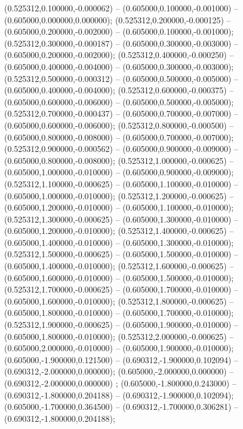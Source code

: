  (0.525312,0.100000,-0.000062) -- (0.605000,0.100000,-0.001000) -- (0.605000,0.000000,0.000000);
 (0.525312,0.200000,-0.000125) -- (0.605000,0.200000,-0.002000) -- (0.605000,0.100000,-0.001000);
 (0.525312,0.300000,-0.000187) -- (0.605000,0.300000,-0.003000) -- (0.605000,0.200000,-0.002000);
 (0.525312,0.400000,-0.000250) -- (0.605000,0.400000,-0.004000) -- (0.605000,0.300000,-0.003000);
 (0.525312,0.500000,-0.000312) -- (0.605000,0.500000,-0.005000) -- (0.605000,0.400000,-0.004000);
 (0.525312,0.600000,-0.000375) -- (0.605000,0.600000,-0.006000) -- (0.605000,0.500000,-0.005000);
 (0.525312,0.700000,-0.000437) -- (0.605000,0.700000,-0.007000) -- (0.605000,0.600000,-0.006000);
 (0.525312,0.800000,-0.000500) -- (0.605000,0.800000,-0.008000) -- (0.605000,0.700000,-0.007000);
 (0.525312,0.900000,-0.000562) -- (0.605000,0.900000,-0.009000) -- (0.605000,0.800000,-0.008000);
 (0.525312,1.000000,-0.000625) -- (0.605000,1.000000,-0.010000) -- (0.605000,0.900000,-0.009000);
 (0.525312,1.100000,-0.000625) -- (0.605000,1.100000,-0.010000) -- (0.605000,1.000000,-0.010000);
 (0.525312,1.200000,-0.000625) -- (0.605000,1.200000,-0.010000) -- (0.605000,1.100000,-0.010000);
 (0.525312,1.300000,-0.000625) -- (0.605000,1.300000,-0.010000) -- (0.605000,1.200000,-0.010000);
 (0.525312,1.400000,-0.000625) -- (0.605000,1.400000,-0.010000) -- (0.605000,1.300000,-0.010000);
 (0.525312,1.500000,-0.000625) -- (0.605000,1.500000,-0.010000) -- (0.605000,1.400000,-0.010000);
 (0.525312,1.600000,-0.000625) -- (0.605000,1.600000,-0.010000) -- (0.605000,1.500000,-0.010000);
 (0.525312,1.700000,-0.000625) -- (0.605000,1.700000,-0.010000) -- (0.605000,1.600000,-0.010000);
 (0.525312,1.800000,-0.000625) -- (0.605000,1.800000,-0.010000) -- (0.605000,1.700000,-0.010000);
 (0.525312,1.900000,-0.000625) -- (0.605000,1.900000,-0.010000) -- (0.605000,1.800000,-0.010000);
 (0.525312,2.000000,-0.000625) -- (0.605000,2.000000,-0.010000) -- (0.605000,1.900000,-0.010000);
 (0.605000,-1.900000,0.121500) -- (0.690312,-1.900000,0.102094) -- (0.690312,-2.000000,0.000000);
 (0.605000,-2.000000,0.000000) -- (0.690312,-2.000000,0.000000) ;
 (0.605000,-1.800000,0.243000) -- (0.690312,-1.800000,0.204188) -- (0.690312,-1.900000,0.102094);
 (0.605000,-1.700000,0.364500) -- (0.690312,-1.700000,0.306281) -- (0.690312,-1.800000,0.204188);
